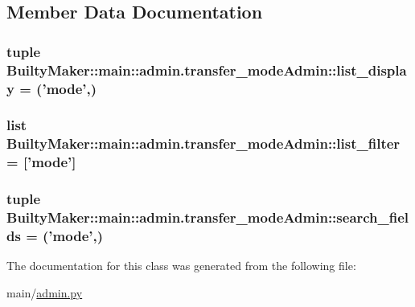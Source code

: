 \subsection{\-Member \-Data \-Documentation}
\hypertarget{classBuiltyMaker_1_1main_1_1admin_1_1transfer__modeAdmin_a279868af897caf674491f8c476ca80ed}{
\subsubsection[{list\-\_\-display}]{\setlength{\rightskip}{0pt plus 5cm}tuple {\bf \-Builty\-Maker\-::main\-::admin.\-transfer\-\_\-mode\-Admin\-::list\-\_\-display} = ('mode',)}}\label{classBuiltyMaker_1_1main_1_1admin_1_1transfer__modeAdmin_a279868af897caf674491f8c476ca80ed}
\hypertarget{classBuiltyMaker_1_1main_1_1admin_1_1transfer__modeAdmin_a9ce28f980a54b85d0daaafcf497b48c3}{
\subsubsection[{list\-\_\-filter}]{\setlength{\rightskip}{0pt plus 5cm}list {\bf \-Builty\-Maker\-::main\-::admin.\-transfer\-\_\-mode\-Admin\-::list\-\_\-filter} = \mbox{[}'mode'\mbox{]}}}\label{classBuiltyMaker_1_1main_1_1admin_1_1transfer__modeAdmin_a9ce28f980a54b85d0daaafcf497b48c3}
\hypertarget{classBuiltyMaker_1_1main_1_1admin_1_1transfer__modeAdmin_afc86627339943d214bdf3bcb158c297a}{
\subsubsection[{search\-\_\-fields}]{\setlength{\rightskip}{0pt plus 5cm}tuple {\bf \-Builty\-Maker\-::main\-::admin.\-transfer\-\_\-mode\-Admin\-::search\-\_\-fields} = ('mode',)}}\label{classBuiltyMaker_1_1main_1_1admin_1_1transfer__modeAdmin_afc86627339943d214bdf3bcb158c297a}


\-The documentation for this class was generated from the following file\-:\begin{DoxyCompactItemize}
\item 
main/\hyperlink{admin_8py}{admin.\-py}\end{DoxyCompactItemize}
